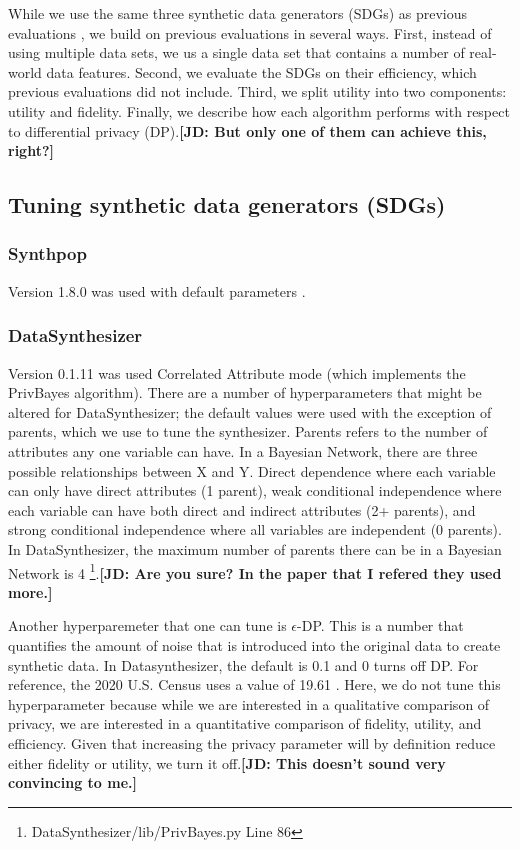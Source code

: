 \documentclass[runningheads]{llncs}
\newcommand{\jd}[1]{\scriptsize {\bf \color{red}[JD: #1]}\normalsize}
\begin{document}
While we use the same three synthetic data generators (SDGs) as previous evaluations \cite{dankar2021fake,little2022comparing}, we build on previous evaluations in several ways.  First, instead of using multiple data sets, we us a single data set that contains a number of real-world data features.  Second, we evaluate the SDGs on their efficiency, which previous evaluations did not include.  Third, we split utility into two components: utility and fidelity.  Finally, we describe how each algorithm performs with respect to differential privacy (DP).\jd{But only one of them can achieve this, right?}  

\subsection{Tuning synthetic data generators (SDGs)}

\subsubsection{Synthpop} Version 1.8.0 \cite{nowok2016synthpop} was used with default parameters . 

\subsubsection{DataSynthesizer} Version 0.1.11 \cite{ping2017datasynthesizer} was used Correlated Attribute mode (which implements the PrivBayes \cite{zhang2017privbayes} algorithm).  There are a number of hyperparameters that might be altered for DataSynthesizer; the default values were used with the exception of parents, which we use to tune the synthesizer.  Parents refers to the number of attributes any one variable can have.  In a Bayesian Network, there are three possible relationships between X and Y.  Direct dependence where each variable can only have direct attributes (1 parent), weak conditional independence where each variable can have both direct and indirect attributes (2+ parents), and strong conditional independence where all variables are independent (0 parents).  In DataSynthesizer, the maximum number of parents there can be in a Bayesian Network is 4 \footnote{DataSynthesizer/lib/PrivBayes.py Line 86}.\jd{Are you sure? In the paper that I refered they used more.}

Another hyperparemeter that one can tune is $\epsilon$-DP. This is a number that quantifies the amount of noise that is introduced into the original data to create synthetic data.  In Datasynthesizer, the default is 0.1 and 0 turns off DP.  For reference, the 2020 U.S. Census uses a value of 19.61 \cite{kenny2021use}.  Here, we do not tune this hyperparameter because while we are interested in a qualitative comparison of privacy, we are interested in a quantitative comparison of fidelity, utility, and efficiency.  Given that increasing the privacy parameter will by definition reduce either fidelity or utility, we turn it off.\jd{This doesn't sound very convincing to me.}
\end{document}
